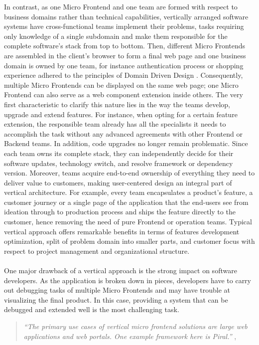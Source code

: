 \documentclass[a4paper]{book}
\begin{document}
In contrast, as one Micro Frontend and one team are formed with respect to business domains rather than technical capabilities, vertically arranged software systems have cross-functional teams implement their problems, tasks requiring only knowledge of a single subdomain and make them responsible for the complete software’s stack from top to bottom. Then, different Micro Frontends are assembled in the client’s browser to form a final web page and one business domain is owned by one team, for instance authentication process or shopping experience adhered to the principles of Domain Driven Design \cite{DDD}. Consequently, multiple Micro Frontends can be displayed on the same web page; one Micro Frontend can also serve as a web component extension inside others. The very first characteristic to clarify this nature lies in the way the teams develop, upgrade and extend features. For instance, when opting for a certain feature extension, the responsible team already has all the specialists it needs to accomplish the task without any advanced agreements with other Frontend or Backend teams. In addition, code upgrades no longer remain problematic. Since each team owns its complete stack, they can independently decide for their software updates, technology switch, and resolve framework or dependency version. Moreover, teams acquire end-to-end ownership of everything they need to deliver value to customers, making user-centered design an integral part of vertical architecture. For example, every team encapsulates a product's feature, a customer journey or a single page of the application that the end-users see from ideation through to production process and ships the feature directly to the customer, hence removing the need of pure Frontend or operation teams. Typical vertical approach offers remarkable benefits in terms of features development optimization, split of problem domain into smaller parts, and customer focus with respect to project management and organizational structure. \cite{Gee20}
\\
\\
One major drawback of a vertical approach is the strong impact on software developers. As the application is broken down in pieces, developers have to carry out debugging tasks of multiple Micro Frontends and may have trouble at visualizing the final product. In this case, providing a system that can be debugged and extended well is the most challenging task. \cite{Rap20}
\begin{quote}
    \textit{“The primary use cases of vertical micro frontend solutions are large web applications and web portals. One example framework here is Piral.”} \cite{Piral}, \cite{Rap20}
\end{quote}
\end{document}
